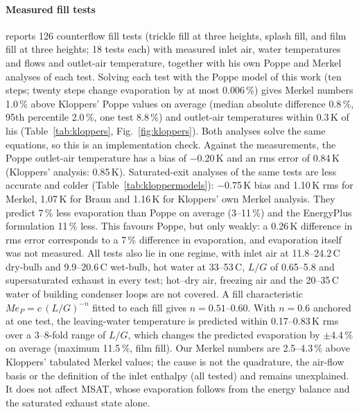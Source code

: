 \documentclass[preprint,12pt]{elsarticle}
\begin{document}
\paragraph{Measured fill tests} \citet{kloppers2003critical} reports 126 counterflow fill tests (trickle fill at three
heights, splash fill, and film fill at three heights; 18 tests each) with measured inlet air, water temperatures and flows
and outlet-air temperature, together with his own Poppe and Merkel analyses of each test. Solving each test with the
Poppe model of this work (ten steps; twenty steps change evaporation by at most 0.006\,\%) gives Merkel numbers 1.0\,\%
above Kloppers' Poppe values on average (median absolute difference 0.8\,\%, 95th percentile 2.0\,\%, one test 8.8\,\%)
and outlet-air temperatures within 0.3\,K of his (Table~\ref{tab:kloppers}, Fig.~\ref{fig:kloppers}). Both analyses
solve the same equations, so this is an implementation check. Against the measurements, the Poppe outlet-air
temperature has a bias of $-$0.20\,K and an rms error of 0.84\,K (Kloppers' analysis: 0.85\,K). Saturated-exit analyses of
the same tests are less accurate and colder (Table~\ref{tab:kloppermodels}): $-$0.75\,K bias and 1.10\,K rms for Merkel,
1.07\,K for Braun and 1.16\,K for Kloppers' own Merkel analysis. They predict 7\,\% less evaporation than Poppe on
average (3--11\,\%) and the EnergyPlus formulation 11\,\% less. This favours Poppe, but only weakly: a 0.26\,K difference
in rms error corresponds to a 7\,\% difference in evaporation, and evaporation itself was not measured. All tests also lie
in one regime, with inlet air at 11.8--24.2\,\textdegree C dry-bulb and 9.9--20.6\,\textdegree C wet-bulb, hot water at
33--53\,\textdegree C, $L/G$ of 0.65--5.8 and supersaturated exhaust in every test; hot--dry air, freezing air and the
20--35\,\textdegree C water of building condenser loops are not covered. A fill characteristic $Me_P=c\,(L/G)^{-n}$ fitted
to each fill gives $n=0.51$--0.60. With $n=0.6$ anchored at one test, the leaving-water temperature is predicted within
0.17--0.83\,K rms over a 3--8-fold range of $L/G$, which changes the predicted evaporation by $\pm$4.4\,\% on average
(maximum 11.5\,\%, film fill). Our Merkel numbers are 2.5--4.3\,\% above Kloppers' tabulated Merkel values; the cause is not
the quadrature, the air-flow basis or the definition of the inlet enthalpy (all tested) and remains unexplained. It does
not affect MSAT, whose evaporation follows from the energy balance and the saturated exhaust state alone.

\begin{table}[t]\centering\scriptsize
\caption{Poppe model against the 126 fill tests of \citet{kloppers2003critical}. $Me_P$ vs K.: mean (maximum absolute)
difference from Kloppers' Poppe analysis. $T_{a,o}$: predicted minus measured outlet-air temperature. $n$: fitted fill
exponent. Last three columns: rating-mode prediction of the leaving-water temperature $T_{w,o}$ with a single-point
$n=0.6$ law or a fitted $Me_P=a\,G_w^{b}G_a^{c}$ law, and the change in predicted Poppe evaporation caused by the
$T_{w,o}$ error of the $n=0.6$ law (not an error against measured evaporation, which is not available).}\label{tab:kloppers}

\end{table}
\end{document}
